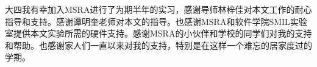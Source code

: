 \documentclass[pdfcover,bachelor]{scutthesis}
\begin{document}
\maketitle
\frontmatter
\tableofcontents{}


\mainmatter










大四我有幸加入MSRA进行了为期半年的实习，感谢导师林梓佳对本文工作的耐心指导和支持。感谢谭明奎老师对本文的指导。也感谢MSRA和软件学院SMIL实验室提供本文实验所需的硬件支持。感谢MSRA的小伙伴和学校的同学们对我的支持和帮助。也感谢家人们一直以来对我的支持，特别是在这样一个难忘的居家度过的学期。
\end{document}
